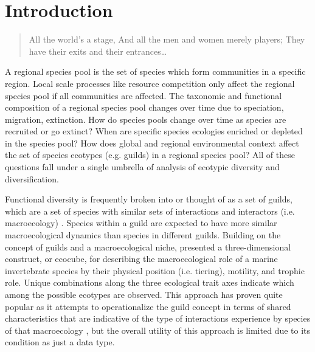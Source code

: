\documentclass[12pt,letterpaper]{article}
\begin{document}
\section*{Introduction}

\begin{quotation}
  All the world's a stage, And all the men and women merely players; They have their exits and their entrances\dots
\end{quotation}


A regional species pool is the set of species which form communities in a specific region. Local scale processes like resource competition only affect the regional species pool if all communities are affected. The taxonomic and functional composition of a regional species pool changes over time due to speciation, migration, extinction. How do species pools change over time as species are recruited or go extinct? When are specific species ecologies enriched or depleted in the species pool? How does global and regional environmental context affect the set of species ecotypes (e.g. guilds) in a regional species pool? All of these questions fall under a single umbrella of analysis of ecotypic diversity and diversification.

Functional diversity is frequently broken into or thought of as a set of guilds, which are a set of species with similar sets of interactions and interactors (i.e. macroecology) \citep{Valentine1969,Bambach1977,Brown1989,Simberloff1991a,Wilson1999}. Species within a guild are expected to have more similar macroecological dynamics than species in different guilds. Building on the concept of guilds and a macroecological niche, \citet{Bush2007} presented a three-dimensional construct, or ecocube, for describing the macroecological role of a marine invertebrate species by their physical position (i.e. tiering), motility, and trophic role. Unique combinations along the three ecological trait axes indicate which among the possible ecotypes are observed. This approach has proven quite popular as it attempts to operationalize the guild concept in terms of shared characteristics that are indicative of the type of interactions experience by species of that macroecology \citep{Bush2007,Bambach2007,Bush2011,Bush2012b,Novack-Gottshall2007,Villeger2011}, but the overall utility of this approach is limited due to its condition as just a data type.
\end{document}
